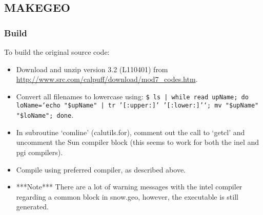 \documentclass[10pt,a4paper]{article}
\begin{document}
\subsection{MAKEGEO}
\subsubsection{Build}
To build the original source code:
\begin{itemize}
\item Download and unzip version 3.2 (L110401) from \url{http://www.src.com/calpuff/download/mod7_codes.htm}.
\item Convert all filenames to lowercase using: \texttt{\$ ls | while read upName; do loName=`echo "\${upName}" | tr '[:upper:]' '[:lower:]'`; mv "\$upName" "\$loName"; done}.
\item In subroutine `comline' (calutils.for), comment out the call to `getcl' and uncomment the Sun compiler block (this seems to work for both the inel and pgi compilers).
\item Compile using preferred compiler, as described above.
\item ***Note*** There are a lot of warning messages with the intel compiler regarding a common block in snow.geo, however, the executable is still generated.
\end{itemize}
\end{document}

